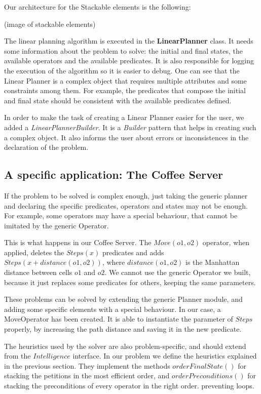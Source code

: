 \documentclass[12pt,a4paper,oneside]{article}
\numberwithin{equation}{section}
\numberwithin{equation}{section}
\theoremstyle{definition}
\begin{document}
Our architecture for the Stackable elements is the following:

(image of stackable elements)

The linear planning algorithm is executed in the \textbf{LinearPlanner} class. It needs some information about the problem to solve: the initial and final states, the available operators and the available predicates. It is also responsible for logging the execution of the algorithm so it is easier to debug. One can see that the Linear Planner is a complex object that requires multiple attributes and some constraints among them. For example, the predicates that compose the initial and final state should be consistent with the available predicates defined.

In order to make the task of creating a Linear Planner easier for the user, we added a \textit{LinearPlannerBuilder}. It is a \textit{Builder} pattern that helps in creating such a complex object. It also informs the user about errors or inconsistences in the declaration of the problem.


\subsection{A specific application: The Coffee Server}

If the problem to be solved is complex enough, just taking the generic planner and declaring the specific predicates, operators and states may not be enough. For example, some operators may have a special behaviour, that cannot be imitated by the generic Operator.

This is what happens in our Coffee Server. The $Move(o1,o2)$ operator, when applied, deletes the $Steps(x)$ predicates and adds $Steps(x + distance(o1,o2))$, where $distance(o1,o2)$ is the Manhattan distance between cells $o1$ and $o2$. We cannot use the generic Operator we built, because it just replaces some predicates for others, keeping the same parameters.

These problems can be solved by extending the generic Planner module, and adding some specific elements with a special behaviour. In our case, a MoveOperator has been created. It is able to instantiate the parameter of $Steps$ properly, by increasing the path distance and saving it in the new predicate.

The heuristics used by the solver are also problem-specific, and should extend from the $Intelligence$ interface. In our problem we define the heuristics explained in the previous section. They implement the methods $orderFinalState()$ for stacking the petitions in the most efficient order, and $orderPreconditions()$ for stacking the preconditions of every operator in the right order. preventing loops.
\end{document}
